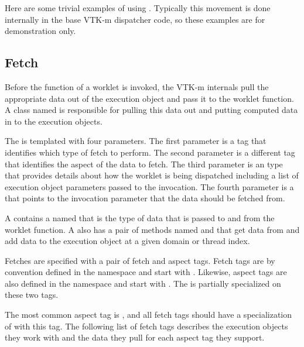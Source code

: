 Here are some trivial examples of using
. Typically this movement is done internally in
the base VTK-m dispatcher code, so these examples are for demonstration
only.



\subsection{Fetch}
\label{sec:Fetch}


Before the function of a worklet is invoked, the VTK-m internals pull the
appropriate data out of the execution object and pass it to the worklet
function. A class named  is responsible for pulling this
data out and putting computed data in to the execution objects.

The   is templated with four
parameters. The first parameter is a tag that identifies which type of
fetch to perform. The second parameter is a different tag that identifies
the aspect of the data to fetch. The third parameter is an
 type that provides details about how the
worklet is being dispatched including a list of execution object parameters
passed to the invocation. The fourth parameter is a  that
points to the invocation parameter that the data should be fetched from.

A  contains a  named
 that is the type of data that is passed to and from
the worklet function. A  also has a pair of methods
named  and  that get data from and add data
to the execution object at a given domain or thread index.


Fetches are specified with a pair of fetch and aspect tags. Fetch tags are by
convention defined in the \vtkmexecarg{} namespace and start with
. Likewise, aspect tags are also defined in the
\vtkmexecarg{} namespace and start with . The
  is partially specialized on these
two tags.

 The most common aspect tag is
, and all fetch tags should have a
specialization of  with this tag. The following list of
fetch tags describes the execution objects they work with and the data they
pull for each aspect tag they support.

